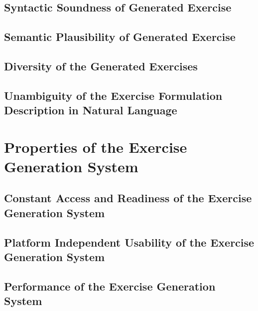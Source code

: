 \subsection{Syntactic Soundness of Generated Exercise}
\label{sec:anal:syntactic}


\subsection{Semantic Plausibility of Generated Exercise}
\label{sec:anal:semantic}


\subsection{Diversity of the Generated Exercises}
\label{sec:anal:diversity}


\subsection{Unambiguity of the Exercise Formulation Description in Natural Language}
\label{sec:anal:unambigous}



\section{Properties of the Exercise Generation System}
\label{sec:anal:properties}

\subsection{Constant Access and Readiness of the Exercise Generation System}
\label{sec:anal:access}


\subsection{Platform Independent Usability of the Exercise Generation System}
\label{sec:anal:platform}


\subsection{Performance of the Exercise Generation System}
\label{sec:anal:performance}

